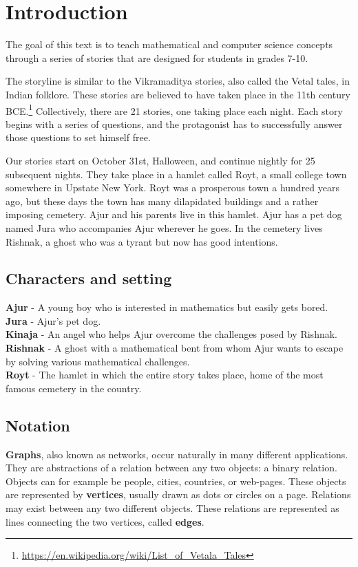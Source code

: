 \chapter{Introduction}
The goal of this text is to teach mathematical and computer science concepts through a series of stories
that are designed for students in grades 7-10.

The storyline is similar to the Vikramaditya stories, also called the Vetal tales, in Indian folklore. These stories are believed to have taken place in the 11th century BCE.\footnote{\url{https://en.wikipedia.org/wiki/List_of_Vetala_Tales}}
Collectively, there are 21 stories, one taking place each night. Each story begins with a series of questions, and the protagonist has to successfully answer those questions to set himself free. 


Our stories start on October 31st, Halloween, and continue nightly for 25 subsequent nights. They take place in a hamlet called Royt, a small college town somewhere in Upstate New York. Royt was a prosperous town a hundred years ago, but these days the town has many dilapidated buildings and a rather imposing cemetery. Ajur and his parents live in this hamlet. Ajur has a pet dog named Jura who accompanies Ajur wherever he goes.  In the cemetery lives Rishnak, a ghost who was a tyrant but now has good intentions.

\section{Characters and setting}

\textbf {Ajur} - A young boy who is interested in mathematics but easily gets bored.\\
\noindent
\textbf {Jura} - Ajur's pet dog.\\
\noindent
\textbf{Kinaja} - An angel who helps Ajur overcome the challenges posed by Rishnak.\\
\noindent
\textbf{Rishnak} - A ghost with a mathematical bent from whom Ajur wants to escape by solving various mathematical challenges.\\
\noindent
\textbf{Royt} - The hamlet in which the entire story takes place, home of the most famous cemetery in the country.

\begin{newpage}
\end{newpage}
\section{Notation}
\textbf{Graphs}, also known as networks, occur naturally in many different applications. They are abstractions of a relation between any two objects: a binary relation. Objects can for example be people, cities, countries, or web-pages. These objects are represented by \textbf{vertices}, usually drawn as dots 
or circles on a page. Relations may exist between any two different objects. These relations are represented as lines connecting the two vertices, called \textbf{edges}.

